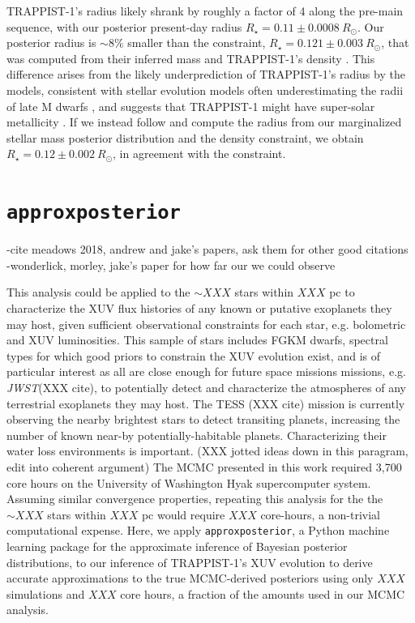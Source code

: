 \documentclass[twocolumn]{aastex62}
\newcommand{\approxposterior}[0]{\texttt{approxposterior}\xspace}
\newcommand{\jwst}[0]{\textit{JWST}\xspace}
\begin{document}
TRAPPIST-1's radius likely shrank by roughly a factor of 4 along the pre-main sequence, with our posterior present-day radius $R_{\star} = 0.11 \pm{0.0008} \ R_{\odot}$. Our posterior radius is ${\sim} 8\%$ smaller than the \citet{vanGrootel2018} constraint, $R_{\star} = 0.121 \pm {0.003} \ R_{\odot}$, that was computed from their inferred mass and TRAPPIST-1's density \citep{Delrez2018}. This difference arises from the likely underprediction of TRAPPIST-1's radius by the \citet{Baraffe2015} models, consistent with stellar evolution models often underestimating the radii of late M dwarfs \citep{Reid2005,Spada2013,Jackson2019}, and suggests that TRAPPIST-1 might have super-solar metallicity \citep{Burgasser2017,vanGrootel2018}. If we instead follow \citet{vanGrootel2018} and compute the radius from our marginalized stellar mass posterior distribution and the \citet{Delrez2018} density constraint, we obtain $R_{\star} = 0.12 \pm{0.002} \ R_{\odot}$, in agreement with the \citet{vanGrootel2018} constraint.


\section{\approxposterior} \label{sec:approx}

-cite meadows 2018, andrew and jake's papers, ask them for other good citations
-wonderlick, morley, jake's paper for how far our we could observe

This analysis could be applied to the ${\sim}XXX$ stars within $XXX$ pc to characterize the XUV flux histories of any known or putative exoplanets they may host, given sufficient observational constraints for each star, e.g. bolometric and XUV luminosities. This sample of stars includes FGKM dwarfs, spectral types for which good priors to constrain the XUV evolution exist, and is of particular interest as all are close enough for future space missions missions, e.g. \jwst (XXX cite), to potentially detect and characterize the atmospheres of any terrestrial exoplanets they may host. The TESS (XXX cite) mission is currently observing the nearby brightest stars to detect transiting planets, increasing the number of known near-by potentially-habitable planets. Characterizing their water loss environments is important. (XXX jotted ideas down in this paragram, edit into coherent argument)  The MCMC presented in this work required 3,700 core hours on the University of Washington Hyak supercomputer system. Assuming similar convergence properties, repeating this analysis for the the ${\sim}XXX$ stars within $XXX$ pc would require $XXX$ core-hours, a non-trivial computational expense. Here, we apply \approxposterior, a Python machine learning package for the approximate inference of Bayesian posterior distributions, to our inference of TRAPPIST-1's XUV evolution to derive accurate approximations to the true MCMC-derived posteriors using only $XXX$ simulations and $XXX$ core hours, a fraction of the amounts used in our MCMC analysis.
\end{document}
